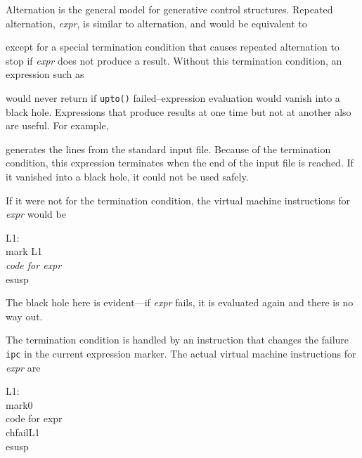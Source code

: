 Alternation is the general model for generative control
structures. Repeated alternation, \texttt{{\textbar}}\textit{expr}, is
similar to alternation, and would be equivalent to


\noindent except for a special termination condition that causes
repeated alternation to stop if \textit{expr} does not produce a
result. Without this termination condition, an expression such as


\noindent would never return if \texttt{upto()} failed--expression
evaluation would vanish into a {\textquotedbl}black
hole.{\textquotedbl} Expressions that produce results at one time but
not at another also are useful. For example,


\noindent generates the lines from the standard input file. Because of
the termination condition, this expression terminates when the end of
the input file is reached. If it vanished into a {\textquotedbl}black
hole,{\textquotedbl} it could not be used safely.

If it were not for the termination condition, the virtual machine
instructions for \texttt{{\textbar}}\textit{expr} would be

\begin{iconcode}
L1:\\
\>\>mark\>\>\>\> L1\\
\>\>\textit{code for expr}\\
\>\>esusp
\end{iconcode}

The {\textquotedbl}black hole{\textquotedbl} here is evident---if
\textit{expr} fails, it is evaluated again and there is no way out.

The termination condition is handled by an instruction that changes
the failure \texttt{ipc} in the current expression marker. The actual
virtual machine instructions for \texttt{{\textbar}}\textit{expr} are

\begin{iconcode}
L1:\\
\>\>mark0\\
\>\>code for expr\\
\>\>chfail\>\>\>\>L1\\
\>\>esusp
\end{iconcode}

